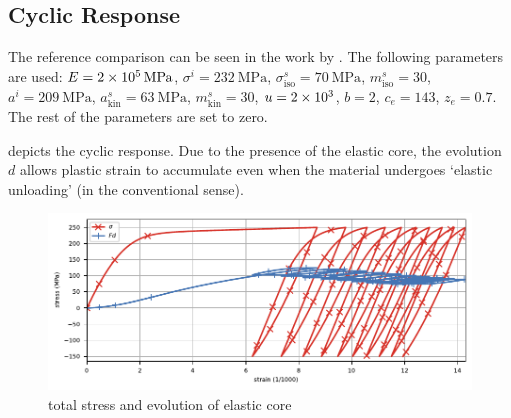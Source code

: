 \subsection{Cyclic Response}
The reference comparison can be seen in the work by \citet{Hassan2008,Hashiguchi2017a}.
The following parameters are used:
$E=\SI{2E5}{\mega\pascal}$,
$\sigma^i=\SI{232}{\mega\pascal}$,
$\sigma^s_\text{iso}=\SI{70}{\mega\pascal}$,
$m^s_\text{iso}=\num{30}$,
$a^i=\SI{209}{\mega\pascal}$,
$a^s_\text{kin}=\SI{63}{\mega\pascal}$,
$m^s_\text{kin}=\num{30}$,
$u=\num{2E3}$,
$b=\num{2}$,
$c_e=\num{143}$,
$z_e=\num{0.7}$.
The rest of the parameters are set to zero.

 depicts the cyclic response.
Due to the presence of the elastic core, the evolution $d$ allows plastic strain to accumulate even when the material undergoes `elastic unloading' (in the conventional sense).
\begin{figure}[htb]
\centering
\includegraphics{PIC/CYCLIC/cyclic.total.pdf}
\caption{total stress and evolution of elastic core}\label{fig:cyclic_total}
\end{figure}

